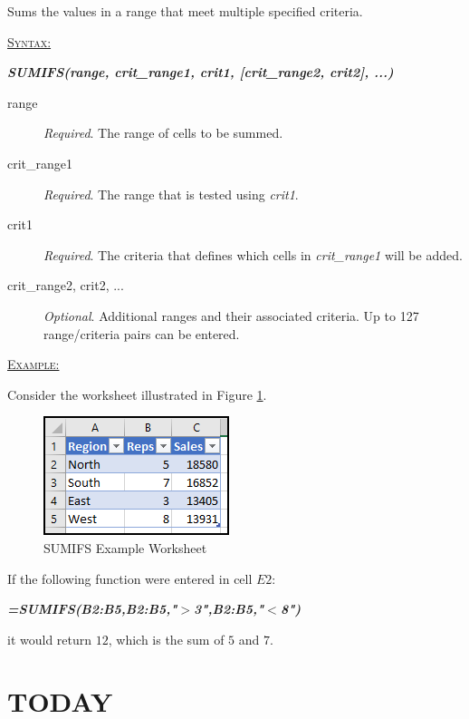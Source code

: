 Sums the values in a range that meet multiple specified criteria.

\begin{addmargin}[1cm]{0cm}
	
	\medskip
	\underline{\textsc{Syntax:}}
	\medskip
	
	{\color{Syntax}
		\noindent\textbf{\textit{SUMIFS(range, crit\_range1, crit1, [crit\_range2, crit2], ...)}}
	}
	
	\begin{description}
		\item[range] \textit{Required}. The range of cells to be summed. 
		\item[crit\_range1] \textit{Required}. The range that is tested using \textit{crit1}.
		\item[crit1] \textit{Required}. The criteria that defines which cells in \textit{crit\_range1} will be added.
		\item[crit\_range2, crit2, ...] \textit{Optional}. Additional ranges and their associated criteria. Up to 127 range/criteria pairs can be entered.
	\end{description}

	\medskip
	\noindent\underline{\textsc{Example:}}
	\medskip
	
	\noindent Consider the worksheet illustrated in Figure \ref{apa:sfs}.
	
	\begin{figure}[H]
		\centering
		\includegraphics[width=\maxwidth{.45\linewidth}]{gfx/apa_fig01}
		\caption{SUMIFS Example Worksheet}
		\label{apa:sfs}
	\end{figure}
	
	\noindent If the following function were entered in cell $ E2 $:
	
	{\color{Syntax}
		\textit{\textbf{=SUMIFS(B2:B5,B2:B5,"$ > $3",B2:B5,"$ < $8")}}
	}
	
	\noindent it would return $ 12 $, which is the sum of $ 5 $ and $ 7 $.

\end{addmargin}
 
\section{TODAY}

